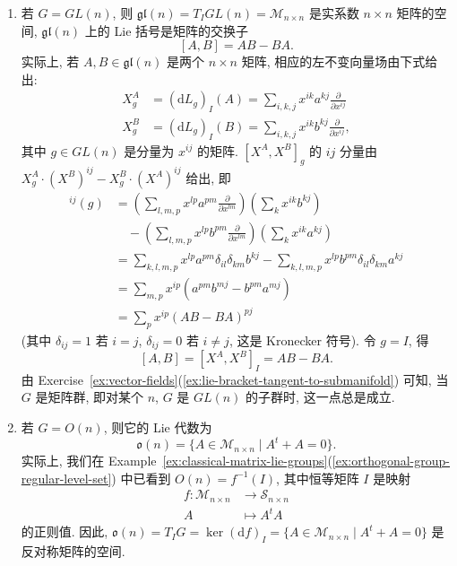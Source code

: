 \begin{RiemannExample}\label{ex:lie-algebras-of-matrix-groups}
\begin{enumerate}[label=(\arabic*),ref=\arabic*,leftmargin=*]
\item 若 $G=GL(n)$, 则 $\mathfrak{gl}(n)=T_I GL(n)=\mathcal M_{n\times n}$ 是实系数 $n\times n$ 矩阵的空间, $\mathfrak{gl}(n)$ 上的 Lie 括号是矩阵的交换子
\[
  [A,B]=AB-BA.
\]
实际上, 若 $A,B\in\mathfrak{gl}(n)$ 是两个 $n\times n$ 矩阵, 相应的左不变向量场由下式给出:
\begin{align*}
  X_g^A&=(\mathrm{d}L_g)_I(A)
       =\sum_{i,k,j}x^{ik}a^{kj}\frac{\partial}{\partial x^{ij}}\\
  X_g^B&=(\mathrm{d}L_g)_I(B)
       =\sum_{i,k,j}x^{ik}b^{kj}\frac{\partial}{\partial x^{ij}},
\end{align*}
其中 $g\in GL(n)$ 是分量为 $x^{ij}$ 的矩阵. $[X^A,X^B]_g$ 的 $ij$ 分量由 $X_g^A\cdot(X^B)^{ij}-X_g^B\cdot(X^A)^{ij}$ 给出, 即
\begin{align*}
  [X^A,X^B]^{ij}(g)
   &=\left(\sum_{l,m,p}x^{lp}a^{pm}\frac{\partial}{\partial x^{lm}}\right)
       \left(\sum_k x^{ik}b^{kj}\right)\\
   &\quad-\left(\sum_{l,m,p}x^{lp}b^{pm}\frac{\partial}{\partial x^{lm}}\right)
       \left(\sum_k x^{ik}a^{kj}\right)\\
   &=\sum_{k,l,m,p}x^{lp}a^{pm}\delta_{il}\delta_{km}b^{kj}
       -\sum_{k,l,m,p}x^{lp}b^{pm}\delta_{il}\delta_{km}a^{kj}\\
   &=\sum_{m,p}x^{ip}(a^{pm}b^{mj}-b^{pm}a^{mj})\\
   &=\sum_p x^{ip}(AB-BA)^{pj}
\end{align*}
(其中 $\delta_{ij}=1$ 若 $i=j$, $\delta_{ij}=0$ 若 $i\ne j$, 这是 Kronecker 符号). 令 $g=I$, 得
\[
  [A,B]=[X^A,X^B]_I=AB-BA.
\]
由 Exercise~\ref{ex:vector-fields}(\ref{ex:lie-bracket-tangent-to-submanifold}) 可知, 当 $G$ 是矩阵群, 即对某个 $n$, $G$ 是 $GL(n)$ 的子群时, 这一点总是成立.
\item\label{ex:lie-algebra-orthogonal-group} 若 $G=O(n)$, 则它的 Lie 代数为
\[
  \mathfrak o(n)=\{A\in\mathcal M_{n\times n}\mid A^t+A=0\}.
\]
实际上, 我们在 Example~\ref{ex:classical-matrix-lie-groups}(\ref{ex:orthogonal-group-regular-level-set}) 中已看到 $O(n)=f^{-1}(I)$, 其中恒等矩阵 $I$ 是映射
\begin{align*}
  f:\mathcal M_{n\times n}&\to\mathcal S_{n\times n}\\ A&\mapsto A^tA
\end{align*}
的正则值. 因此, $\mathfrak o(n)=T_IG=\ker(\mathrm{d}f)_I=\{A\in\mathcal M_{n\times n}\mid A^t+A=0\}$ 是反对称矩阵的空间.

\end{enumerate}
\end{RiemannExample}
